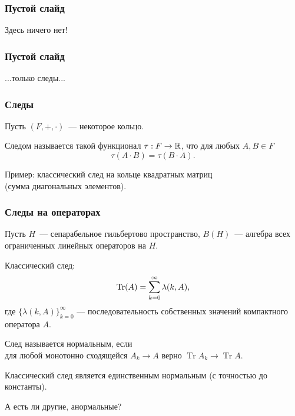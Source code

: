\begin{frame}\frametitle{Пустой слайд}

	Здесь ничего нет!
\end{frame}

\begin{frame}\frametitle{Пустой слайд}

	...только следы...
\end{frame}




\begin{frame}\frametitle{Следы}
	\label{page:Dixmier}
	Пусть $(F, +, \cdot)$~--- некоторое кольцо.
	\begin{ddefinition}
		Следом называется такой функционал $\tau : F \to \mathbb{R}$,
		что для любых $A,B\in F$
		\begin{equation}
			\tau (A\cdot B) = \tau (B\cdot A)
			.
		\end{equation}
	\end{ddefinition}
	\vfill
	Пример: классический след на кольце квадратных матриц
	\\
	(сумма диагональных элементов).


\end{frame}


\begin{frame}\frametitle{Следы на операторах}
	Пусть $H$~--- сепарабельное гильбертово пространство,
	$B(H)$~--- алгебра всех ограниченных линейных операторов на $H$.

	\bigskip

	Классический след:
	$${\rm Tr} (A)= \sum_{k=0}^\infty \lambda(k,A),$$
	где $\{\lambda(k,A)\}_{k=0}^\infty$ --- последовательность собственных значений компактного оператора $A$.

	\bigskip

	След называется нормальным, если
	\\
	для любой монотонно сходящейся $A_k\to A$ верно $\operatorname{Tr} A_k \to\operatorname{Tr} A$.

	\vfill
	Классический след является единственным нормальным (с точностью до константы).

	А есть ли другие, анормальные?


\end{frame}



